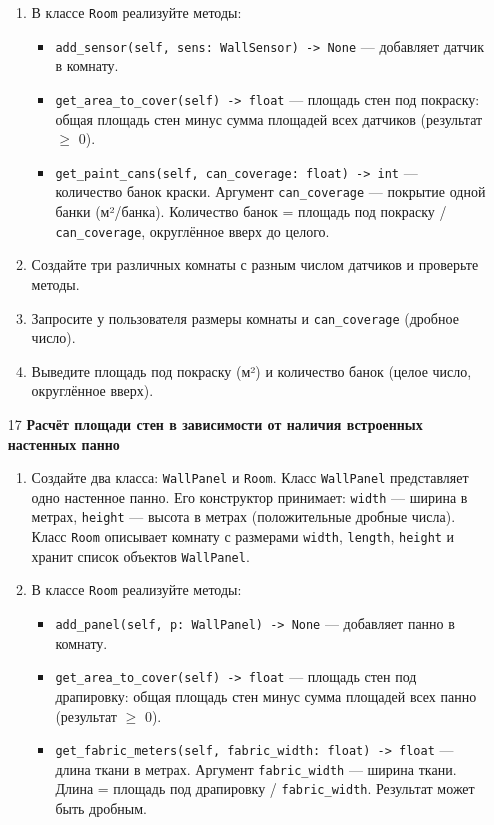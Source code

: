 \begin{enumerate}
\begin{enumerate}
    \item В классе \texttt{Room} реализуйте методы:  
    \begin{itemize}
        \item \texttt{add\_sensor(self, sens: WallSensor) -> None} — добавляет датчик в комнату.
        \item \texttt{get\_area\_to\_cover(self) -> float} — площадь стен под покраску: общая площадь стен минус сумма площадей всех датчиков (результат $\geqslant$ 0).
        \item \texttt{get\_paint\_cans(self, can\_coverage: float) -> int} — количество банок краски. Аргумент \texttt{can\_coverage} — покрытие одной банки (м²/банка). Количество банок = площадь под покраску / \texttt{can\_coverage}, округлённое вверх до целого.
    \end{itemize}

    \item Создайте три различных комнаты с разным числом датчиков и проверьте методы.

    \item Запросите у пользователя размеры комнаты и \texttt{can\_coverage} (дробное число).

    \item Выведите площадь под покраску (м²) и количество банок (целое число, округлённое вверх).
\end{enumerate}

\item[17] \textbf{Расчёт площади стен в зависимости от наличия встроенных настенных панно}
\begin{enumerate}
    \item Создайте два класса: \texttt{WallPanel} и \texttt{Room}.  
    Класс \texttt{WallPanel} представляет одно настенное панно. Его конструктор принимает:  
    \texttt{width} — ширина в метрах,  
    \texttt{height} — высота в метрах (положительные дробные числа).  
    Класс \texttt{Room} описывает комнату с размерами \texttt{width}, \texttt{length}, \texttt{height} и хранит список объектов \texttt{WallPanel}.

    \item В классе \texttt{Room} реализуйте методы:  
    \begin{itemize}
        \item \texttt{add\_panel(self, p: WallPanel) -> None} — добавляет панно в комнату.
        \item \texttt{get\_area\_to\_cover(self) -> float} — площадь стен под драпировку: общая площадь стен минус сумма площадей всех панно (результат $\geqslant$ 0).
        \item \texttt{get\_fabric\_meters(self, fabric\_width: float) -> float} — длина ткани в метрах. Аргумент \texttt{fabric\_width} — ширина ткани. Длина = площадь под драпировку / \texttt{fabric\_width}. Результат может быть дробным.
    \end{itemize}


\end{enumerate}
\end{enumerate}

